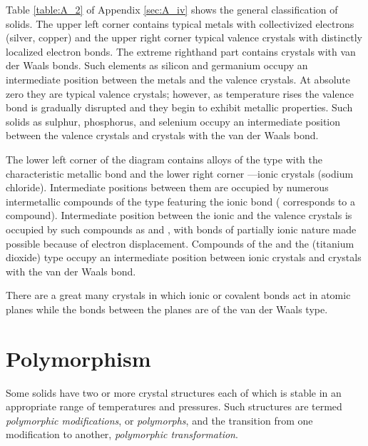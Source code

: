 Table \ref{table:A_2} of Appendix \ref{sec:A_iv} shows the general classification of solids. The upper left corner contains typical metals with collectivized electrons (silver, copper) and the upper right corner typical valence crystals with distinctly localized electron bonds. The extreme righthand part contains crystals with van der Waals bonds. Such elements as silicon and germanium occupy an intermediate position between the metals and the valence crystals. At absolute zero they are typical valence crystals; however, as temperature rises the valence bond is gradually disrupted and they begin to exhibit metallic properties. Such solids as sulphur, phosphorus, and selenium occupy an intermediate position between the valence crystals and crystals with the van der Waals bond.

The lower left corner of the diagram contains alloys of the  type with the characteristic metallic bond and the lower right corner ---ionic crystals (sodium chloride). Intermediate positions between them are occupied by numerous intermetallic compounds of the  type featuring the ionic bond ( corresponds to a  compound). Intermediate position between the ionic and the valence crystals is occupied by such compounds as  and , with bonds of partially ionic nature made possible because of electron displacement. Compounds of the  and the  (titanium dioxide) type occupy an intermediate position between ionic crystals and crystals with the van der Waals bond.

There are a great many crystals in which ionic or covalent bonds act in atomic planes while the bonds between the planes are of the van der Waals type.

\section{Polymorphism}\label{sec:1_11}

Some solids have two or more crystal structures each of which is stable in an appropriate range of temperatures and pressures. Such structures are termed \textit{polymorphic modifications}, or \textit{polymorphs},
and the transition from one modification to another, \textit{polymorphic
transformation}.

